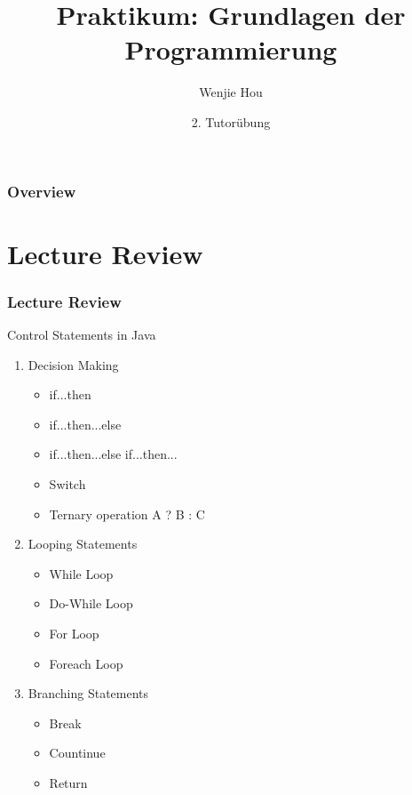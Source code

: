 \documentclass[handout, navsym]{tum-presentation}
\title{Praktikum: Grundlagen der Programmierung}
\author[Wenjie Hou]{Wenjie Hou}
\date{2. Tutorübung}
\institute{\theuniversity\par Fakultät für Informatik}
\numberwithin{equation}{section}
\begin{document}
\begin{frame}[noframenumbering]
  \titlepage
\end{frame}

\begin{frame}[t]
  \frametitle{Overview}
 \tableofcontents[section=show,subsectionstyle=show]
\end{frame}


\section{Lecture Review}

\begin{frame}
  \frametitle{Lecture Review}

  \begin{alertblock}{Control Statements in Java}
   \begin{enumerate}
  \item Decision Making
  	\begin{itemize}
	\item if...then
	\item if...then...else
	\item if...then...else if...then...
	\item Switch
	\item Ternary operation A ? B : C
	\end{itemize}
  \item Looping Statements
  	\begin{itemize}
	\item While Loop
	\item Do-While Loop
	\item For Loop
	\item Foreach Loop
	\end{itemize}
  \item Branching Statements
  \begin{itemize}
	\item Break
	\item Countinue
	\item Return
	\end{itemize}
  \end{enumerate}
  \end{alertblock}
\end{frame}
\end{document}
